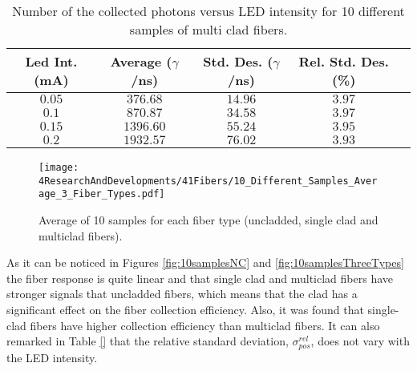\begin{table}[htbp]
\begin{center}
\begin{tabular}{|c|c|c|c|c|}
\hline
Led Int. (mA) & Average ($\gamma$/ns) & Std. Des. ($\gamma$/ns) & Rel. Std. Des. (\%)\\
\hline \hline \hline
$0.05$ & $376.68$ & $14.96$ & $3.97$ \\ \hline
$0.1$ & $870.87$ & $34.58$ & $3.97$ \\ \hline
$0.15$ & $1396.60$ & $55.24$ & $3.95$ \\ \hline
$0.2$ & $1932.57$ & $76.02$ & $3.93$ \\ \hline
\end{tabular}
\caption{Number of the collected photons versus LED intensity for 10 different samples of multi clad fibers.}
\label{tab:10DifferentSamplesMultiClad}
\end{center}
\end{table}

\begin{figure}[h]
\centering
\texttt{[image: 4ResearchAndDevelopments/41Fibers/10\_Different\_Samples\_Average\_3\_Fiber\_Types.pdf]}
\caption{Average of 10 samples for each fiber type (uncladded, single clad and multiclad fibers).\label{fig:AveregeThreeFiberTypes}}
\end{figure}

As it can be noticed in Figures \ref{fig:10samplesNC} and \ref{fig:10samplesThreeTypes} the fiber response is quite linear and that single clad and multiclad fibers have stronger signals that uncladded fibers, which means that the clad has a significant effect on the fiber collection efficiency. Also, it was found that single-clad fibers have higher collection efficiency than multiclad fibers. It can also remarked in Table \ref{} that the relative standard deviation, $\sigma^{rel}_{pos}$, does not vary with the LED intensity.



